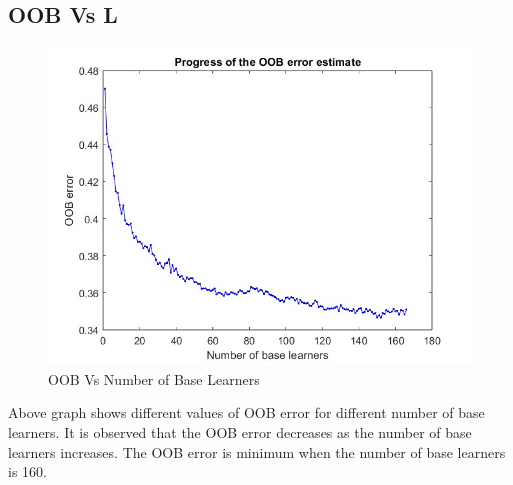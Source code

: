 \subsection{OOB Vs L}
\begin{figure}[H]
    \centering
    \includegraphics[width=120mm]{./img/2600/staturAATE2600.jpg}
    \caption{OOB Vs Number of Base Learners}
\end{figure}
Above graph shows different values of OOB error for different number of base learners. It is observed that the OOB error decreases as the number of base learners increases. The OOB error is minimum when the number of base learners is 160.
